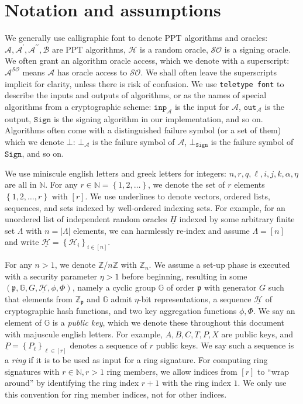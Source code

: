 \documentclass{mrl}
\theoremstyle{definition}
\numberwithin{theorem}{subsection}
\newcommand{\adversary}{\mathcal{A}}
\newcommand{\bbz}{\mathbb{Z}}
\newcommand{\bbn}{\mathbb{N}}
\newcommand{\group}{\mathbb{G}}
\newcommand{\p}{\mathfrak{p}}
\begin{document}
\section{Notation and assumptions}\label{notation}

We generally use calligraphic font to denote PPT algorithms and oracles: $\adversary, \adversary^\prime, \adversary^{\prime \prime}, \mathcal{B}$ are PPT algorithms, $\mathcal{H}$ is a random oracle, $\mathcal{SO}$ is a signing oracle. We often grant an algorithm oracle access, which we denote with a superscript: $\mathcal{A}^{\mathcal{SO}}$ means $\mathcal{A}$ has oracle access to $\mathcal{SO}$. We shall often leave the superscripts implicit for clarity, unless there is risk of confusion. We use \texttt{teletype font} to describe the inputs and outputs of algorithms, or as the names of special algorithms from a cryptographic scheme: $\texttt{inp}_\adversary$ is the input for $\adversary$, $\texttt{out}_\adversary$ is the output, $\texttt{Sign}$ is the signing algorithm in our implementation, and so on. Algorithms often come with a distinguished failure symbol (or a set of them) which we denote $\bot$: $\bot_\adversary$ is the failure symbol of $\adversary$, $\bot_{\texttt{Sign}}$ is the failure symbol of $\texttt{Sign}$, and so on.

We use miniscule english letters and greek letters for integers: $n, r, q, \ell, i, j, k, \alpha, \eta$ are all in $\bbn$. For any $r \in \bbn = \left\{1, 2, \ldots\right\}$, we denote the set of $r$ elements $\left\{1, 2, \ldots, r\right\}$ with $\left[r\right]$. We use underlines to denote vectors, ordered lists, sequences, and sets indexed by well-ordered indexing sets. For example, for an unordered list of independent random oracles $\underline{H}$ indexed by some arbitrary finite set $\Lambda$ with $n = \left|\Lambda\right|$ elements, we can harmlessly re-index and assume $\Lambda = [n]$ and write $\underline{\mathcal{H}} = \left\{\mathcal{H}_i\right\}_{i \in [n]}$. 

For any $n > 1$, we denote $\bbz/n\bbz$ with $\bbz_n$. We assume a set-up phase is executed with a security parameter $\eta > 1$ before beginning, resulting in some $(\p, \group, G, \underline{\mathcal{H}}, \phi, \Phi)$, namely a cyclic group $\group$ of order $\p$ with generator $G$ such that elements from $\bbz_\p$ and $\mathbb{G}$ admit $\eta$-bit representations, a sequence $\underline{\mathcal{H}}$ of cryptographic hash functions, and two key aggregation functions $\phi, \Phi$. We say an element of $\group$ is a \textit{public key}, which we denote these throughout this document with majuscule english letters. For example, $A, B, C, T, P, X$ are public keys, and $\underline{P} = \left\{P_\ell \right\}_{\ell \in [r]}$ denotes a sequence of $r$ public keys.  We say such a sequence is a \textit{ring} if it is to be used as input for a ring signature. For computing ring signatures with $r \in \bbn, r > 1$ ring members, we allow indices from $[r]$ to ``wrap around'' by identifying the ring index $r+1$ with the ring index $1$. We only use this convention for ring member indices, not for other indices. 
\end{document}
